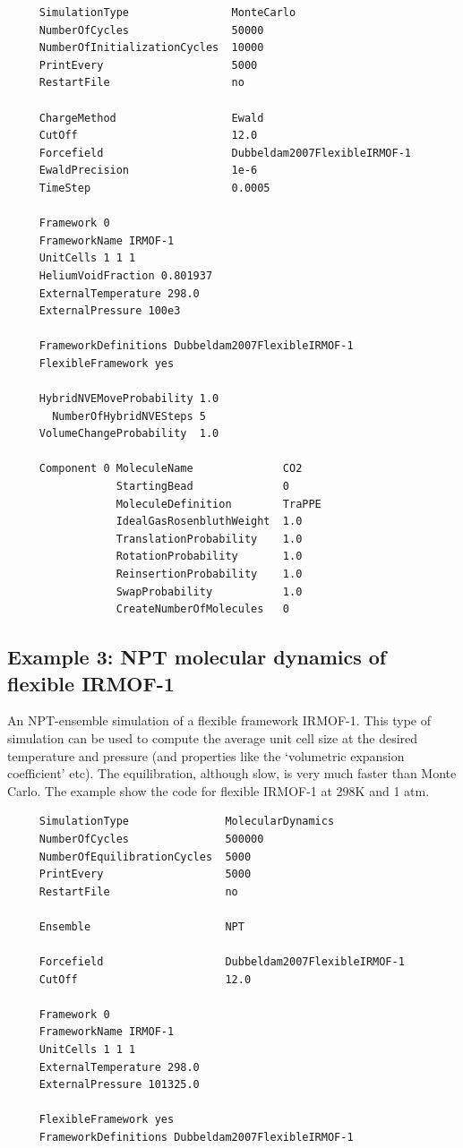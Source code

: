 \begin{tiny}
\begin{verbatim}
     SimulationType                MonteCarlo
     NumberOfCycles                50000
     NumberOfInitializationCycles  10000
     PrintEvery                    5000
     RestartFile                   no
     
     ChargeMethod                  Ewald
     CutOff                        12.0
     Forcefield                    Dubbeldam2007FlexibleIRMOF-1
     EwaldPrecision                1e-6
     TimeStep                      0.0005
     
     Framework 0
     FrameworkName IRMOF-1
     UnitCells 1 1 1
     HeliumVoidFraction 0.801937
     ExternalTemperature 298.0
     ExternalPressure 100e3
     
     FrameworkDefinitions Dubbeldam2007FlexibleIRMOF-1
     FlexibleFramework yes
     
     HybridNVEMoveProbability 1.0
       NumberOfHybridNVESteps 5
     VolumeChangeProbability  1.0
     
     Component 0 MoleculeName              CO2
                 StartingBead              0
                 MoleculeDefinition        TraPPE
                 IdealGasRosenbluthWeight  1.0
                 TranslationProbability    1.0
                 RotationProbability       1.0
                 ReinsertionProbability    1.0
                 SwapProbability           1.0
                 CreateNumberOfMolecules   0
\end{verbatim}
\end{tiny}

\subsection*{Example 3: NPT molecular dynamics of flexible IRMOF-1}

An NPT-ensemble simulation of a flexible framework IRMOF-1. This type of simulation can be used to compute the average
unit cell size at the desired temperature and pressure (and properties like the `volumetric expansion coefficient' etc).
The equilibration, although slow, is very much faster than Monte Carlo. The example show the code for flexible
IRMOF-1 at 298K and 1 atm.

\begin{tiny}
\begin{verbatim}
     SimulationType               MolecularDynamics
     NumberOfCycles               500000
     NumberOfEquilibrationCycles  5000
     PrintEvery                   5000
     RestartFile                  no
     
     Ensemble                     NPT
     
     Forcefield                   Dubbeldam2007FlexibleIRMOF-1
     CutOff                       12.0
     
     Framework 0
     FrameworkName IRMOF-1
     UnitCells 1 1 1
     ExternalTemperature 298.0
     ExternalPressure 101325.0
     
     FlexibleFramework yes
     FrameworkDefinitions Dubbeldam2007FlexibleIRMOF-1
\end{verbatim}
\end{tiny}


